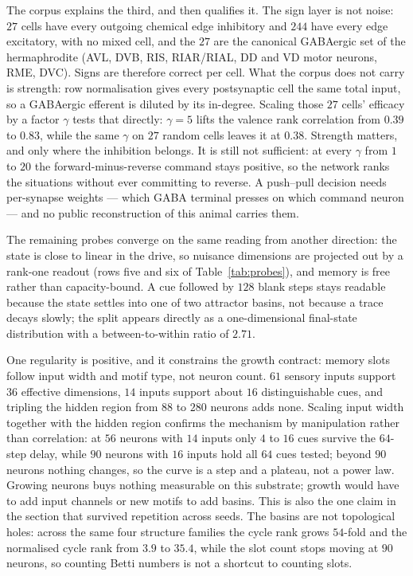 \documentclass[11pt]{article}
\theoremstyle{remark}
\begin{document}
The corpus explains the third, and then qualifies it. The sign layer is not noise: $27$ cells have
every outgoing chemical edge inhibitory and $244$ have every edge excitatory, with no mixed cell, and
the $27$ are the canonical GABAergic set of the hermaphrodite (AVL, DVB, RIS, RIAR/RIAL, DD and VD
motor neurons, RME, DVC). Signs are therefore correct per cell. What the corpus does not carry is
strength: row normalisation gives every postsynaptic cell the same total input, so a GABAergic
efferent is diluted by its in-degree. Scaling those $27$ cells' efficacy by a factor $\gamma$ tests
that directly: $\gamma=5$ lifts the valence rank correlation from $0.39$ to $0.83$, while the same
$\gamma$ on $27$ random cells leaves it at $0.38$. Strength matters, and only where the inhibition
belongs. It is still not sufficient: at every $\gamma$ from $1$ to $20$ the forward-minus-reverse
command stays positive, so the network ranks the situations without ever committing to reverse. A
push--pull decision needs per-synapse weights --- which GABA terminal presses on which command
neuron --- and no public reconstruction of this animal carries them.

The remaining probes converge on the same reading from another direction: the state is close to linear in
the drive, so nuisance dimensions are projected out by a rank-one readout (rows five and six of
Table~\ref{tab:probes}), and memory is free rather than capacity-bound. A cue followed by $128$ blank
steps stays readable because the state settles into one of two attractor basins, not because a trace
decays slowly; the split appears directly as a one-dimensional final-state distribution with a
between-to-within ratio of $2.71$.

One regularity is positive, and it constrains the growth contract: memory slots follow input width and
motif type, not neuron count. $61$ sensory inputs support $36$ effective dimensions, $14$ inputs
support about $16$ distinguishable cues, and tripling the hidden region from $88$ to $280$ neurons
adds none. Scaling input width together with the hidden region confirms the mechanism by manipulation
rather than correlation: at $56$ neurons with $14$ inputs only $4$ to $16$ cues survive the $64$-step
delay, while $90$ neurons with $16$ inputs hold all $64$ cues tested; beyond $90$ neurons nothing
changes, so the curve is a step and a plateau, not a power law. Growing neurons buys nothing
measurable on this substrate; growth would have to add input channels or new motifs to add basins.
This is also the one claim in the section that survived repetition across seeds. The basins are not
topological holes: across the same four structure families the cycle rank grows $54$-fold and the
normalised cycle rank from $3.9$ to $35.4$, while the slot count stops moving at $90$ neurons, so
counting Betti numbers is not a shortcut to counting slots.
\end{document}
